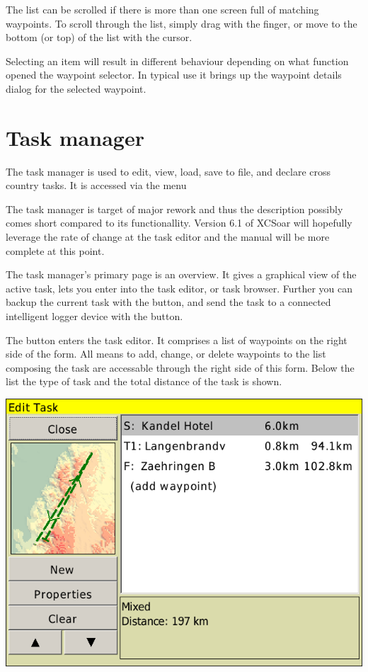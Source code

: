 \documentclass[a4paper,12pt]{refrep}
\begin{document}
The list can be scrolled if there is more than one screen full of
matching waypoints.  To scroll through the list, simply drag with the finger, or
move to the bottom (or top) of the list with the cursor.   

Selecting an item will result in different behaviour
depending on what function opened the waypoint selector.  In typical
use it brings up the waypoint details dialog for the selected
waypoint.

\section{Task manager}\label{sec:task-manager-dialog}
The task manager is used to edit, view, load, save to file, and declare cross
country tasks. It is accessed via the menu
\begin{quote}
\blink{}\blink{}
\end{quote} 

\begin{it}The task manager is target of major rework and thus the description
possibly comes short compared to its functionallity. Version 6.1 of XCSoar will hopefully
leverage the rate of change at the task editor and the manual will be more
complete at this point.\end{it}

The task manager's primary page is an overview. It gives a graphical
view of the active task, lets you enter into the task editor, or task browser.
Further you can backup the current task with the  button, and 
send the task to a connected intelligent logger device with the 
button.

The  button enters the task editor. It comprises a list of 
waypoints on the right side of the form. All means to add, change, or
delete waypoints to the list composing the task are accessable through the right
side of this form. 
Below the list the type of task and the total distance of the task is shown.
\begin{center}
\includegraphics[angle=0,width=\linewidth,keepaspectratio='true']{figures/dialog-taskedit0.png}
\end{center}
\end{document}
